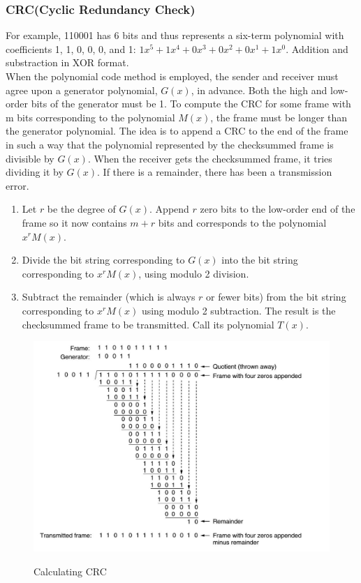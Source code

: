 \documentclass[a4paper,oneside]{book}
\begin{document}
\subsubsection{CRC(Cyclic Redundancy Check)}
For example, 110001 has 6 bits and thus represents a six-term polynomial with coefficients 1, 1, 0, 0, 0, and 1: $1x^5 + 1x^4 + 0x^3 + 0x^2 + 0x^1 + 1x^0$. Addition and substraction in XOR format.\\
When the polynomial code method is employed, the sender and receiver must agree upon a generator polynomial, $G(x)$, in advance. Both the high and low-order bits of the generator must be 1. To compute the CRC for some frame with m bits corresponding to the polynomial $M(x)$, the frame must be longer than the generator polynomial. The idea is to append a CRC to the end of the frame in
such a way that the polynomial represented by the checksummed frame is divisible by $G(x)$. When the receiver gets the checksummed frame, it tries dividing it by $G(x)$. If there is a remainder, there has been a transmission error.
\begin{enumerate}
\item Let $r$ be the degree of $G(x)$. Append $r$ zero bits to the low-order end of the frame so it now contains $m + r$ bits and corresponds to the polynomial $x^rM(x)$.
\item Divide the bit string corresponding to $G(x)$ into the bit string corresponding to $x^rM(x)$, using modulo 2 division.
\item Subtract the remainder (which is always $r$ or fewer bits) from the bit string corresponding to $x^rM(x)$ using modulo 2 subtraction. The result is the checksummed frame to be transmitted. Call its polynomial $T(x)$.
\end{enumerate}
\begin{figure}[H]
\caption{Calculating CRC}
\includegraphics[scale=0.6]{Images/crc}
\label{fig:cn_crc}
\end{figure}
\end{document}
